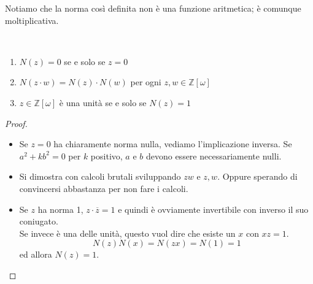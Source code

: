 \begin{osservazione}
	Notiamo che la norma così definita non è una funzione aritmetica; è comunque moltiplicativa.
\end{osservazione}
\begin{proposizione}\
	\begin{enumerate}
		\item $N(z)=0$ se e solo se $z=0$
		\item $N(z\cdot w)=N(z)\cdot N(w)$ per ogni $z,w\in\mathbb{Z}[\omega]$
		\item $z\in\mathbb{Z}[\omega]$ è una unità se e solo se $N(z)=1$
	\end{enumerate}
\end{proposizione}
\begin{proof}\
	\begin{itemize}
		\item Se $z=0$ ha chiaramente norma nulla, vediamo l'implicazione inversa. Se $a^2+kb^2=0$ per $k$ positivo, $a$ e $b$ devono essere necessariamente nulli.
		\item Si dimostra con calcoli brutali sviluppando $zw$ e $z,w$. Oppure sperando di convincersi abbastanza per non fare i calcoli.
		\item Se $z$ ha norma 1, $z\cdot\overline{z}=1$ e quindi è ovviamente invertibile con inverso il suo coniugato.\\
		Se invece è una delle unità, questo vuol dire che esiste un $x$ con $xz=1$. 
		\begin{equation*}
			N(z)N(x) = N(zx)=N(1)=1
		\end{equation*}
		ed allora $N(z)=1$.
	\end{itemize}
\end{proof}
